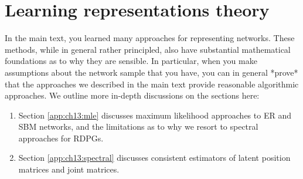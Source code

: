\chapter{Learning representations theory}
\label{app:ch13}


In the main text, you learned many approaches for representing networks. These methods, while in general rather principled, also have substantial mathematical foundations as to why they are sensible. In particular, when you make assumptions about the network sample that you have, you can in general *prove* that the approaches we described in the main text provide reasonable algorithmic approaches. We outline more in-depth discussions on the sections here:

\begin{enumerate}
    \item Section \ref{app:ch13:mle} discusses maximum likelihood approaches to ER and SBM networks, and the limitations as to why we resort to spectral approaches for RDPGs.
    \item Section \ref{app:ch13:spectral} discusses consistent estimators of latent position matrices and joint matrices.
\end{enumerate}







